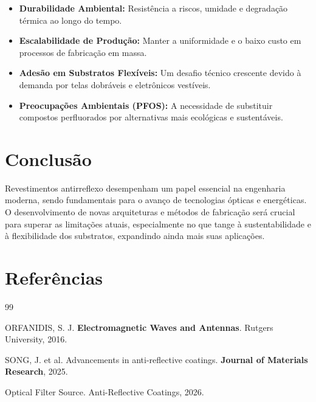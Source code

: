 \documentclass[12pt]{article}
\begin{document}
\begin{itemize}[itemsep=0.5ex]
    \item \textbf{Durabilidade Ambiental:} Resistência a riscos, umidade e degradação térmica ao longo do tempo.
    \item \textbf{Escalabilidade de Produção:} Manter a uniformidade e o baixo custo em processos de fabricação em massa.
    \item \textbf{Adesão em Substratos Flexíveis:} Um desafio técnico crescente devido à demanda por telas dobráveis e eletrônicos vestíveis.
    \item \textbf{Preocupações Ambientais (PFOS):} A necessidade de substituir compostos perfluorados por alternativas mais ecológicas e sustentáveis.
\end{itemize}

\section{Conclusão}

Revestimentos antirreflexo desempenham um papel essencial na engenharia moderna, sendo fundamentais para o avanço de tecnologias ópticas e energéticas. O desenvolvimento de novas arquiteturas e métodos de fabricação será crucial para superar as limitações atuais, especialmente no que tange à sustentabilidade e à flexibilidade dos substratos, expandindo ainda mais suas aplicações.

\section{Referências}

\begin{thebibliography}{99}

ORFANIDIS, S. J.
\textbf{Electromagnetic Waves and Antennas}.
Rutgers University, 2016.

SONG, J. et al.
Advancements in anti-reflective coatings.
\textbf{Journal of Materials Research}, 2025.

Optical Filter Source.
Anti-Reflective Coatings, 2026.

\end{thebibliography}
\end{document}
